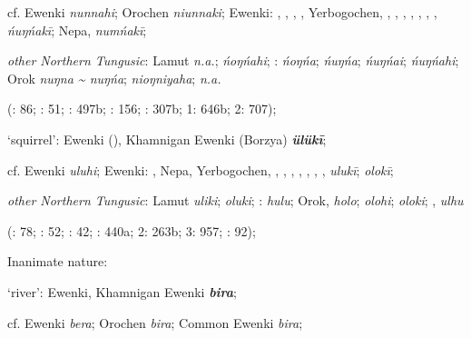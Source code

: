 \documentclass[output=paper,colorlinks,citecolor=brown]{langscibook}
\begin{document}
\begin{xlist}
\begin{xlist}
    cf.  Ewenki \textit{nunnahi}; Orochen \textit{niunnaki};  Ewenki: , , , , Yerbogochen, , , , , , , ,  \textit{ńuŋńakī}; Nepa,  \textit{numńakī};

    \textit{other Northern Tungusic}: Lamut \textit{n.a.};  \textit{ńoŋńahi}; \textit{}:  \textit{ńoŋńa};  \textit{ńuŋńa};  \textit{ńuŋńai};  \textit{ńuŋńahi}; Orok \textit{nuŋna {\textasciitilde} nuŋńa};  \textit{nioŋniyaha};  \textit{n.a.}
    
    (\citealt{Castrén1856}: 86; \citealt{Janhunen1991}: 51; \citealt{Dorji1998}: 497b; \citealt{Chaoke2014a}: 156; \citealt{Vasilevic1958}: 307b; \citealt{Cincius1975B} 1: 646b; \citealt{Hauer1952} 2: 707);

    \ex ‘squirrel’:  Ewenki (), Khamnigan Ewenki (Borzya) \textbf{\textit{ülükī}};

    cf.  Ewenki \textit{uluhi};  Ewenki: , Nepa, Yerbogochen, , , , , , , ,  \textit{ulukī};  \textit{olokī};

    \textit{other Northern Tungusic}: Lamut \textit{uliki};  \textit{oluki}; \textit{}:  \textit{hulu}; Orok,  \textit{holo};  \textit{olohi};  \textit{oloki}; ,  \textit{ulhu}
    
    (\citealt{Castrén1856}: 78; \citealt{Janhunen1991}: 52; \citealt{Chaoke2014bB}: 42; \citealt{Vasilevic1958}: 440a; \citealt{Cincius1975B} 2: 263b; \citealt{Hauer1952} 3: 957; \citealt{Stary1990}: 92);

\end{xlist}

    \ex Inanimate nature:

\begin{xlist}
    \ex ‘river’:  Ewenki, Khamnigan Ewenki \textbf{\textit{bira}};

    cf.  Ewenki \textit{bera}; Orochen \textit{bira};  Common Ewenki \textit{bira};


\end{xlist}
\end{xlist}
\end{document}
